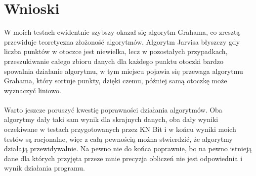 \documentclass[a4paper]{article}
\begin{document}
\section{Wnioski}
W moich testach ewidentnie szybszy okazał się algorytm Grahama, co zresztą przewiduje teoretyczna złożoność algorytmów.
Algorytm Jarvisa błyszczy gdy liczba punktów w otoczce jest niewielka, lecz w pozostałych przypadkach, przeszukiwanie całego
zbioru danych dla każdego punktu otoczki bardzo spowalnia działanie algorytmu, w tym miejscu pojawia się przewaga algorytmu 
Grahama, który sortuje punkty, dzięki czemu, później samą otoczkę może wyznaczyć liniowo.\\\\

\noindent Warto jeszcze poruszyć kwestię poprawności działania algorytmów. Oba algorytmy dały taki sam wynik dla skrajnych danych,
oba dały wyniki oczekiwane w testach przygotowanych przez KN Bit i w końcu wyniki moich testów są racjonalne, więc z całą
pewnością można stwierdzić, że algorytmy działają przewidywalnie. Na pewno nie do końca poprawnie, bo na pewno istnieją dane 
dla których przyjęta przeze mnie precyzja obliczeń nie jest odpowiednia i wynik działania programu.
\end{document}

